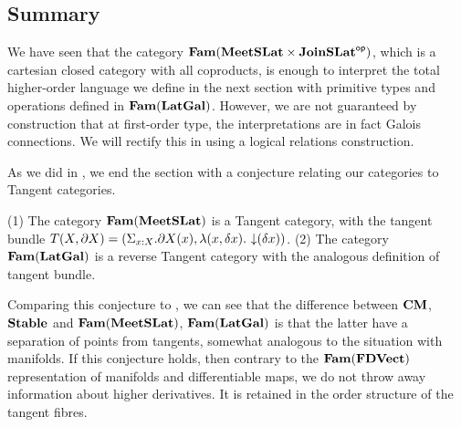 \subsection{Summary}
\label{sec:models:summary}

We have seen that the category $\mathbf{Fam}(\mathbf{MeetSLat} \times \mathbf{JoinSLat}^{\mathsf{op}})$,
which is a cartesian closed category with all coproducts, is enough to
interpret the total higher-order language we define in the next
section with primitive types and operations defined in
$\mathbf{Fam}(\mathbf{LatGal})$. However, we are not guaranteed by construction that
at first-order type, the interpretations are in fact Galois
connections. We will rectify this in  using a
logical relations construction.

As we did in , we end the section with a
conjecture relating our categories to Tangent categories.

\begin{conjecture}
  \label{con:tangent-fam}
  (1) The category $\mathbf{Fam}(\mathbf{MeetSLat})$ is a Tangent category, with the
  tangent bundle
  $T(X, \partial X) = (\Sigma_{x : X}. \partial X(x), \lambda (x,
  \delta x).\, \mathop{\downarrow}(\delta x))$. (2) The category $\mathbf{Fam}(\mathbf{LatGal})$
  is a reverse Tangent category with the analogous definition of
  tangent bundle.
\end{conjecture}

Comparing this conjecture to , we can see
that the difference between $\mathbf{CM}$, $\mathbf{Stable}$ and $\mathbf{Fam}(\mathbf{MeetSLat})$,
$\mathbf{Fam}(\mathbf{LatGal})$ is that the latter have a separation of points from
tangents, somewhat analogous to the situation with manifolds. If this
conjecture holds, then contrary to the $\mathbf{Fam}(\mathbf{FDVect})$ representation
of manifolds and differentiable maps, we do not throw away information
about higher derivatives. It is retained in the order structure of the
tangent fibres.
